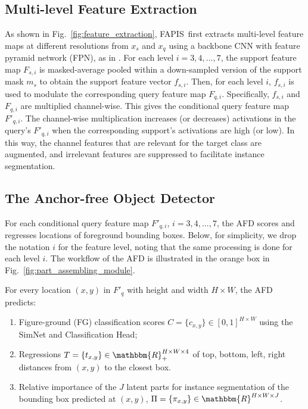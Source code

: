 \documentclass[final]{cvpr}
\def\Approach{FAPIS}
\begin{document}
\subsection{Multi-level Feature Extraction}
As shown in Fig.~\ref{fig:feature_extraction}, \Approach~first extracts multi-level feature maps at different resolutions from $x_s$ and $x_q$ using a backbone CNN with feature pyramid network (FPN), as in \cite{lin2017feature}. For each level  $i=3,4,...,7$, the support feature map $F_{s,i}$ is masked-average pooled within a down-sampled version of the support mask $m_s$ to obtain the support feature vector $f_{s,i}$. Then, for each level  $i$,  $f_{s,i}$ is used to modulate the corresponding query feature map $F_{q,i}$.  Specifically, $f_{s,i}$ and $F_{q,i}$ are multiplied channel-wise. This gives the conditional query feature map $F'_{q,i}$. The channel-wise multiplication increases (or decreases) activations  in the query's $F'_{q,i}$ when the corresponding support's activations are high (or low). In this way, the channel features that are relevant for the target class are augmented, and irrelevant features are suppressed to facilitate instance segmentation.


\subsection{The Anchor-free Object Detector}
For each conditional query feature map $F'_{q,i}$,  $i=3,4,...,7$,  the AFD scores and regresses locations of foreground bounding boxes. Below, for simplicity, we drop the notation $i$ for the feature level, noting that the same processing is done for each level $i$. The workflow of  the AFD is illustrated in the orange box in Fig.~\ref{fig:part_assembling_module}.

For every location $(x,y)$ in $F'_q$ with height and width $H\times W$,  the AFD predicts:
\begin{enumerate}[itemsep=-1pt,topsep=-1pt, partopsep=2pt]
\item Figure-ground (FG) classification scores $C=\{c_{x,y} \}\in [0,1]^{H\times W}$ using the SimNet and Classification Head;
\item Regressions $T=\{t_{x,y}\} \in \mathbbm{R}_+^{H\times W\times4}$ of top, bottom, left, right distances from $(x,y)$ to the closest box.
\item Relative importance of the $J$ latent parts for instance segmentation of the bounding box predicted at $(x,y)$, $\Pi=\{\pi_{x, y} \}\in \mathbbm{R}^{H\times W\times J}$.
\end{enumerate}
\end{document}
